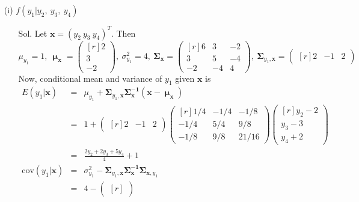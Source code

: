 \documentclass[12pt]{article} %
\begin{document}
\begin{enumerate}
\begin{enumerate}
		\item[(i)] $f(y_{1}|y_{2},~y_{3},~y_{4})$
			\begin{enumerate}
				\item[Sol.] Let $\mathbf{x}=(y_{2}~y_{3}~y_{4})^T$. Then
				\begin{equation*}
					\mu_{y_{1}}=1,~
					\mathbf{\upmu_{x}}=
					\begin{pmatrix}[r]
						2 \\
						3 \\
					   -2
					\end{pmatrix},~
					\sigma_{y_{1}}^{2}=4,~
					\mathbf{\Sigma_{x}}=
					\begin{pmatrix}[r]
						6 & 3 & -2 \\
						3 & 5 & -4 \\
					   -2 &-4 & 4 
					\end{pmatrix},~
					\mathbf{\Sigma}_{y_{1}, \mathbf{x}}=
					\begin{pmatrix}[r]
					2 & -1 & 2
					\end{pmatrix}
				\end{equation*}
				Now, conditional mean and variance of $y_{1}$ given $\mathbf{x}$ is 
				\begin{eqnarray*}
					E(y_{1}|\mathbf{x})&=&
					\mu_{y_{1}}+\mathbf{\Sigma}_{y_{1}, \mathbf{x}}\mathbf{\Sigma_{\mathbf{x}}^{-1}}
					(\mathbf{x}-\mathbf{\upmu}_{\mathbf{x}})\\
					&=&
					1+
					\begin{pmatrix}[r]
						2 & -1 & 2
					\end{pmatrix}
					\begin{pmatrix}[r]
						1/4 & -1/4 & -1/8 \\
					   -1/4 &  5/4 &  9/8 \\
					   -1/8 &  9/8 & 21/16 
					\end{pmatrix}
					\begin{pmatrix}[r]
						y_{2}-2 \\
						y_{3}-3 \\
						y_{4}+2
					\end{pmatrix}\\
					&=&
					\frac{2y_{2}+2y_{3}+5y_{4}}{4}+1\\
					\mathrm{cov}(y_{1}|\mathbf{x}) &=&
					\sigma_{y_{1}}^{2}-\mathbf{\Sigma}_{y_{1},\mathbf{x}}
					\mathbf{\Sigma_{\mathbf{x}}^{-1}}\mathbf{\Sigma}_{\mathbf{x},y_{1}}\\
					&=&
					4-
					\begin{pmatrix}[r]

\end{pmatrix}
\end{eqnarray*}
\end{enumerate}
\end{enumerate}
\end{enumerate}
\end{document}

